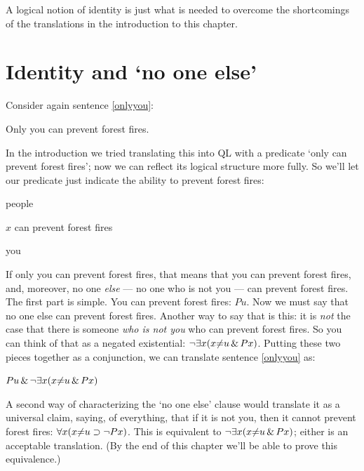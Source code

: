 A logical notion of identity is just what is needed to overcome the shortcomings of the translations in the introduction to this chapter.

\section{Identity and `no one else'}

Consider again sentence \ref{onlyyou}:

\begin{ekey}
\item[\ref{onlyyou}.] Only you can prevent forest fires.
\end{ekey}

In the introduction we tried translating this into QL with a predicate `only  \blank can prevent forest fires'; now we can reflect its logical structure more fully. So we'll let our predicate just indicate the ability to prevent forest fires:

\begin{ekey}
\item[UD:] people
\item[Px:] $x$ can prevent forest fires
\item[u:] you
\end{ekey}

If only you can prevent forest fires, that means that you can prevent forest fires, and, moreover, no one \emph{else} --- no one who is not you --- can prevent forest fires. The first part is simple. You can prevent forest fires: $Pu$. Now we must say that no one else can prevent forest fires. Another way to say that is this: it is \emph{not} the case that there is someone \emph{who is not you} who can prevent forest fires. So you can think of that as a negated existential: $\neg \exists x (x {\neq} u \,\&\, Px)$. Putting these two pieces together as a conjunction, we can translate sentence \ref{onlyyou} as:

\begin{earg}
\item[\ref{onlyyou}.] $Pu \,\&\, \neg \exists x (x {\neq} u \,\&\, Px)$
\end{earg}

A second way of characterizing the `no one else' clause would translate it as a universal claim, saying, of everything, that if it is not you, then it cannot prevent forest fires: $\forall x (x {\neq} u \supset \neg Px)$. This is equivalent to $\neg \exists x (x {\neq} u \,\&\, Px)$; either is an acceptable translation. (By the end of this chapter we'll be able to prove this equivalence.)

